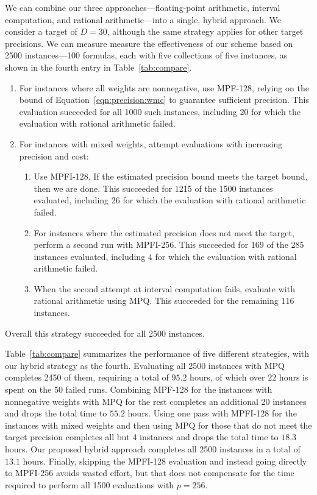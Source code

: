 \documentclass{easychair}
\begin{document}
We can combine our three approaches---floating-point
arithmetic, interval computation, and rational arithmetic---into a
single, hybrid approach.  We consider a target of $D=30$, although the same strategy applies for other target precisions.
We can measure 
measure the effectiveness of our scheme based on 2500 instances---100 formulas, each with five collections of five instances, as shown in the fourth entry in Table~\ref{tab:compare}.
\begin{enumerate}
\item For instances where all weights are nonnegative, use MPF-128,
  relying on the bound of Equation~\ref{eqn:precision:wmc} to
  guarantee sufficient precision.  This evaluation succeeded for all 1000 such
  instances, including 20 for which the evaluation with rational arithmetic failed.
\item For instances with mixed weights, attempt evaluations with increasing precision and cost:
\begin{enumerate}
\item 
  Use MPFI-128.  If the estimated precision
  bound meets the target bound, then we are done.  This succeeded for
  1215 of the 1500 instances evaluated, including 26 for which the evaluation with rational arithmetic failed.
\item For instances where the estimated precision does not meet the target, perform a second run with MPFI-256.  This succeeded
  for 169 of the 285 instances evaluated, including 4 for which the evaluation with rational arithmetic failed.
\item When the second attempt at interval computation fails, evaluate with rational arithmetic using MPQ\@.
This
  succeeded for the remaining 116 instances.
\end{enumerate}
\end{enumerate}
Overall this strategy succeeded for all 2500 instances.

Table~\ref{tab:compare} summarizes the performance of five different strategies, with our hybrid strategy as the fourth.
Evaluating all 2500
instances with MPQ completes
2450 of them, requiring a
total of $95.2$ hours, of which over 
$22$ hours is spent on the 50 failed runs.
Combining MPF-128 for the instances with nonnegative weights with MPQ for the rest
completes an
additional 20 instances and drops the total time to $55.2$ hours.
Using one pass with MPFI-128
for the instances with mixed weights and then using MPQ for those
that do not meet the target precision completes all but 4 instances
and drops the total time to $18.3$ hours.
Our proposed hybrid approach completes all 2500 instances in a total of
$13.1$ hours.
Finally, skipping the MPFI-128 evaluation and instead going directly to MPFI-256 avoids
wasted effort, but that
does not
compensate for the time required to perform all 1500 evaluations 
with $p=256$.  
\end{document}
